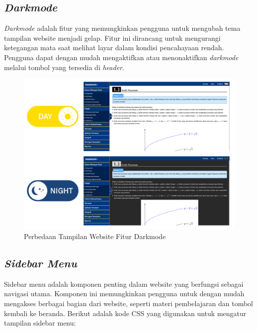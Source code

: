 \documentclass{file/KP-ITS}
\theoremstyle{definition}
\theoremstyle{definition}
\theoremstyle{plain}
\begin{document}
\subsection{\textit{Darkmode}}
\textit{Darkmode} adalah fitur yang memungkinkan pengguna untuk mengubah tema tampilan website menjadi gelap. Fitur ini dirancang untuk mengurangi ketegangan mata saat melihat layar dalam kondisi pencahayaan rendah. Pengguna dapat dengan mudah mengaktifkan atau menonaktifkan \textit{darkmode} melalui tombol yang tersedia di \textit{header}.
\begin{figure}[h!]
    \centering
    \includegraphics[width=\textwidth]{foto/LightDarkMode.png}
    \caption{Perbedaan Tampilan Website Fitur Darkmode}
\end{figure}
\subsection{\textit{Sidebar Menu}}
Sidebar menu adalah komponen penting dalam website yang berfungsi sebagai navigasi utama. Komponen ini memungkinkan pengguna untuk dengan mudah mengakses berbagai bagian dari website, seperti materi pembelajaran dan tombol kembali ke beranda. Berikut adalah kode CSS yang digunakan untuk mengatur tampilan sidebar menu:
\end{document}
